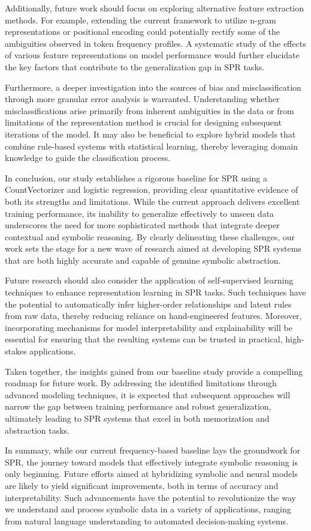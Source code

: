 \documentclass{article}
\begin{document}
Additionally, future work should focus on exploring alternative feature extraction methods. For example, extending the current framework to utilize n-gram representations or positional encoding could potentially rectify some of the ambiguities observed in token frequency profiles. A systematic study of the effects of various feature representations on model performance would further elucidate the key factors that contribute to the generalization gap in SPR tasks.

Furthermore, a deeper investigation into the sources of bias and misclassification through more granular error analysis is warranted. Understanding whether misclassifications arise primarily from inherent ambiguities in the data or from limitations of the representation method is crucial for designing subsequent iterations of the model. It may also be beneficial to explore hybrid models that combine rule-based systems with statistical learning, thereby leveraging domain knowledge to guide the classification process.

In conclusion, our study establishes a rigorous baseline for SPR using a CountVectorizer and logistic regression, providing clear quantitative evidence of both its strengths and limitations. While the current approach delivers excellent training performance, its inability to generalize effectively to unseen data underscores the need for more sophisticated methods that integrate deeper contextual and symbolic reasoning. By clearly delineating these challenges, our work sets the stage for a new wave of research aimed at developing SPR systems that are both highly accurate and capable of genuine symbolic abstraction.

Future research should also consider the application of self-supervised learning techniques to enhance representation learning in SPR tasks. Such techniques have the potential to automatically infer higher-order relationships and latent rules from raw data, thereby reducing reliance on hand-engineered features. Moreover, incorporating mechanisms for model interpretability and explainability will be essential for ensuring that the resulting systems can be trusted in practical, high-stakes applications.

Taken together, the insights gained from our baseline study provide a compelling roadmap for future work. By addressing the identified limitations through advanced modeling techniques, it is expected that subsequent approaches will narrow the gap between training performance and robust generalization, ultimately leading to SPR systems that excel in both memorization and abstraction tasks.
 
In summary, while our current frequency-based baseline lays the groundwork for SPR, the journey toward models that effectively integrate symbolic reasoning is only beginning. Future efforts aimed at hybridizing symbolic and neural models are likely to yield significant improvements, both in terms of accuracy and interpretability. Such advancements have the potential to revolutionize the way we understand and process symbolic data in a variety of applications, ranging from natural language understanding to automated decision-making systems.
 
\end{document}
